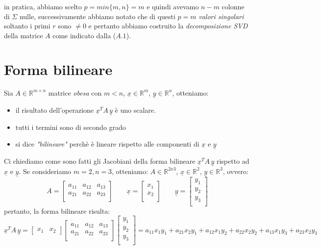 in pratica, abbiamo scelto $p = min \lbrace m,n \rbrace = m$ e quindi avevamo $n-m$ colonne di $\Sigma$ nulle, successivamente abbiamo notato che di questi $p = m$ \emph{valori singolari} soltanto i primi $r$ sono $\neq 0$ e pertanto abbiamo costruito la \emph{decomposizione SVD} della matrice $A$ come indicato dalla ($A.1$).
\section{Forma bilineare}
Sia $A \in \mathbb{R}^{m \times n}$ matrice \emph{obesa} con $m<n$, $\underline{x} \in \mathbb{R}^m$, $\underline{y} \in \mathbb{R}^n$, otteniamo:
\begin{itemize}
	\item il risultato dell'operazione $\underline{x}^TA\,\underline{y}$ è uno scalare.
	\item tutti i termini sono di secondo grado
	\item si dice \emph{"bilineare"} perchè è lineare rispetto alle componenti di $\underline{x}$ e $\underline{y}$
\end{itemize}
Ci chiediamo come sono fatti gli Jacobiani della forma bilineare $\underline{x}^TA\,\underline{y}$ rispetto ad $\underline{x}$ e $\underline{y}$. Se consideriamo $m = 2, n = 3$, otteniamo: $A\in\mathbb{R}^{2x3}$, $\underline{x}\in\mathbb{R}^2$, $\underline{y}\in\mathbb{R}^3$, ovvero:
\begin{equation*}
	A =
	\begin{bmatrix}
		a_{11} & a_{12} & a_{13} \\
		a_{21} & a_{22} & a_{23} \\
	\end{bmatrix}
	\qquad
	\underline{x} =
	\begin{bmatrix}
		x_1 \\
		x_2 \\
	\end{bmatrix}
	\qquad
	\underline{y} = 
	\begin{bmatrix}
		y_1 \\
		y_2 \\
		y_3 \\
	\end{bmatrix}
\end{equation*}
pertanto, la forma bilineare risulta:
\begin{equation*}
	\underline{x}^TA\,\underline{y} =
	\begin{bmatrix}
		x_1 & x_2
	\end{bmatrix}
	\begin{bmatrix}
		a_{11} & a_{12} & a_{13} \\
		a_{21} & a_{22} & a_{23} \\
	\end{bmatrix}
	\begin{bmatrix}
		y_1 \\
		y_2 \\
		y_3 \\
	\end{bmatrix}
	= a_{11}x_1y_1 + a_{21}x_2y_1 + a_{12}x_1y_2 + a_{22}x_2y_2 + a_{13}x_1y_3 + a_{23}x_2y_3
\end{equation*}
